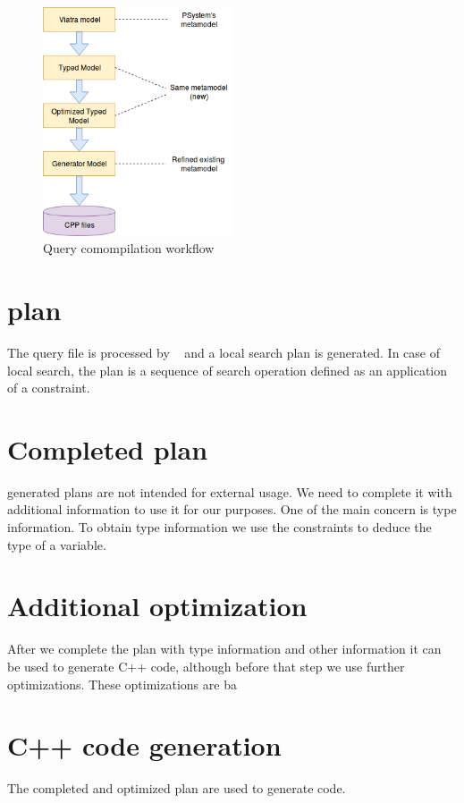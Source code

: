 \begin{figure}[h]
	\begin{center}
		\includegraphics[width=0.5\textwidth]{figures/workflow.png}
		\caption{Query comompilation workflow}
		\label{figure:query-compile-workflow}
	\end{center}
\end{figure}


\section{\viatra{} plan}

The query file is processed by \viatra{}~\cite{viatra} and a local search plan is generated. In case of local search, the plan is a sequence of search operation defined as an application of a constraint.


\section{Completed plan}

\viatra{} generated plans are not intended for external usage. We need to complete it with additional information to use it for our purposes. One of the main concern is type information. To obtain type information we use the constraints to deduce the type of a variable. 


\section{Additional optimization}

After we complete the plan with type information and other information it can be used to generate C++ code, although before that step we use further optimizations. These optimizations are ba

\section{C++ code generation}

The completed and optimized plan are used to generate \cpp{} code.










